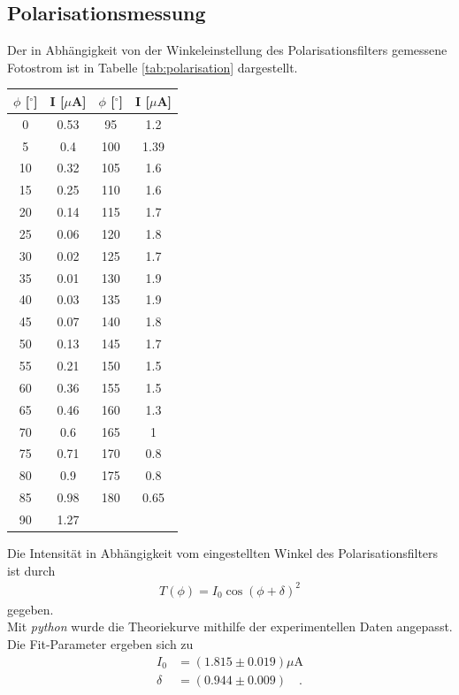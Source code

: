 \documentclass[]{scrartcl}
\begin{document}
\subsection{Polarisationsmessung}
Der in Abhängigkeit von der Winkeleinstellung des Polarisationsfilters gemessene Fotostrom ist in Tabelle \ref{tab:polarisation} dargestellt.
\begin{center}
	\begin{tabular}{|c|c||c|c|}
	\hline $\phi$ [$^{\circ}$] & I [$\mu$A] & $\phi$ [$^{\circ}$] & I [$\mu$A]\\
	\hline 0	&	0.53	&	95	&	1.2	\\
		   5	&	0.4	&	100	&	1.39	\\
	   	  10	&	0.32	&	105	&	1.6	\\
		  15	&	0.25	&	110	&	1.6	\\
	   	  20	&	0.14	&	115	&	1.7	\\
		  25	&	0.06	&	120	&	1.8	\\
		  30	&	0.02	&	125	&	1.7	\\
		  35	&	0.01	&	130	&	1.9	\\
		  40	&	0.03	&	135	&	1.9	\\
		  45	&	0.07	&	140	&	1.8	\\
		  50	&	0.13	&	145	&	1.7	\\
		  55	&	0.21	&	150	&	1.5	\\
		  60	&	0.36	&	155	&	1.5	\\
		  65	&	0.46	&	160	&	1.3	\\
		  70	&	0.6	&	165	&	1	\\
		  75	&	0.71	&	170	&	0.8	\\
		  80	&	0.9	&	175	&	0.8	\\
		  85	&	0.98	&	180	&	0.65	\\
		  90	&	1.27	&		&		\\				
	\hline
		\end{tabular}
		\label{tab:polarisation}
\end{center}
Die Intensität in Abhängigkeit vom eingestellten Winkel des Polarisationsfilters ist durch 
\begin{align}
T(\phi)=I_0\cos\left(\phi+\delta\right)^2
\end{align}
gegeben. \\
Mit \textit{python} wurde die Theoriekurve mithilfe der experimentellen Daten angepasst. Die Fit-Parameter ergeben sich zu
\begin{align*}
I_0&=(1.815 \pm 0.019)\si{\mu\ampere} \\
\delta&=(0.944 \pm 0.009)\quad.
\end{align*}
\end{document}
